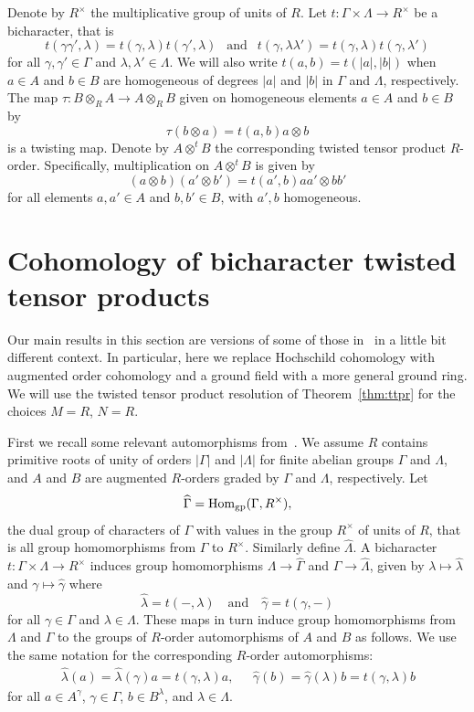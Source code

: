 \documentclass[11pt]{amsart}
\numberwithin{equation}{section}
\theoremstyle{definition}
\theoremstyle{remark}
\newcommand{\g}{\gamma}
\newcommand{\hg}{\widehat{\g}}
\newcommand{\h}{\lambda}
\newcommand{\hh}{\widehat{\h}}
\newcommand{\hG}{\widehat{\Gamma}}
\newcommand{\hD}{\widehat{\Lambda}}
\newcommand\ot{\otimes}
\newcommand\ott{\otimes^{t}\!}
\newcommand{\ttpt}{A\ott B}
\newcommand\Hom{\operatorname{Hom}}
\begin{document}
Denote by $R^{\times}$ the multiplicative group of units of $R$. 
Let $t: \Gamma\times\Lambda \rightarrow R^{\times}$ be a bicharacter, that is
\[
t(\g\g',\h) = t(\g,\h)t(\g',\h) \ \ \mbox{ and } \ \
t(\g,\h\h') = t(\g,\h)t(\g,\h')
\]
for all $\g,\g'\in\Gamma$ and $\h,\h'\in\Lambda$.
We will also write $t(a,b) = t(|a|,|b|)$ when $a\in A$ and $b\in B$
are homogeneous of degrees $|a|$ and $|b|$ in $\Gamma$ and $\Lambda$,
respectively.
The map $\tau: B\ot_R A\rightarrow A\ot_R B$ given on 
homogeneous elements $a\in A$ and $b\in B$ by 
\[
   \tau(b\ot a) = t(a,b) a\ot b
\]
is a twisting map.
Denote by $\ttpt$ the corresponding twisted tensor product $R$-order.
Specifically, multiplication on $\ttpt$ is given by 
\[
(a\ot b)(a'\ot b') = t(a',b) aa'\ot bb'
\]
for all elements $a,a'\in A$ and $b,b'\in B$,
with $a', b$ homogeneous. 


\section{Cohomology of bicharacter twisted tensor products}\label{sec:additive}

Our main results in this section are versions of some of those in~\cite{BW}
in a little bit different context.
In particular, here we replace 
Hochschild cohomology with augmented order cohomology
and a ground field with a more general ground ring.
We will use the twisted tensor product resolution of Theorem~\ref{thm:ttpr}
for the choices $M=R$, $N=R$. 

First we recall some relevant automorphisms from~\cite{BW}.
We assume $R$ contains primitive roots of unity
of orders $|\Gamma|$ and $|\Lambda|$ for finite abelian groups 
$\Gamma$ and $\Lambda$, and $A$ and $B$ are augmented $R$-orders
graded by $\Gamma$ and $\Lambda$, respectively.
Let
\[
\hG = \Hom_{{\rm{gp}}} (\Gamma , R^{\times}) ,
\]
the dual group of characters of $\Gamma$ with values in
the group $R^{\times}$ of units of $R$,
that is all group homomorphisms from $\Gamma$ to $R^{\times}$.
Similarly define $\hD$.
A bicharacter $t:\Gamma\times\Lambda\rightarrow R^{\times}$ induces group homomorphisms 
$\Lambda  \longrightarrow \hG$
and $\Gamma  \longrightarrow \hD$, given by
$\h \mapsto \hh$ and $\g   \mapsto \hg$ 
where 
\[
   \hh = t( - , \h) \ \ \ \mbox{ and } \ \ \ \hg = t(\g, - )
\] 
for all $\gamma\in\Gamma$ and $\lambda\in\Lambda$. 
These maps in turn induce group homomorphisms from $\Lambda$
and $\Gamma$ to the groups of $R$-order automorphisms of $A$ and $B$
as follows. 
We use the same notation for the corresponding $R$-order automorphisms:
\[
\begin{aligned}
  &\hh (a) = \hh (\g) a = t(\g,\h)a , \ \ \
          &\hg (b)  = \hg (\h)b = t(\g,\h)b \ \ \
\end{aligned}
\]
for all $a\in A^{\g}$, $\g\in \Gamma$,
$b\in B^{\h}$, and $\h\in\Lambda$.
\end{document}
